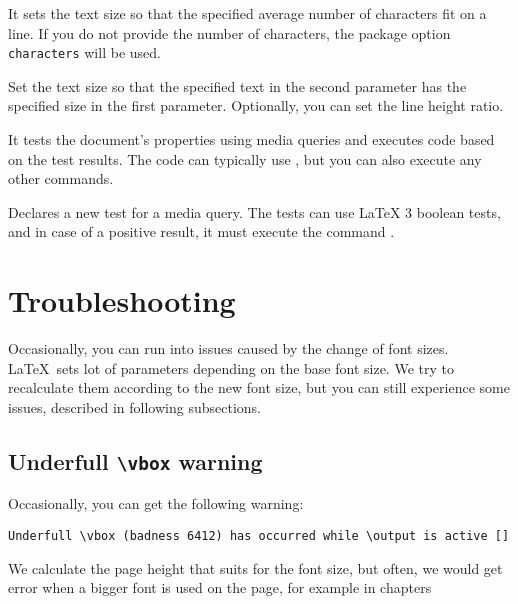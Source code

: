 \documentclass{ltxdoc}
\newcommand\StartDescribe[1]{%
  \par\medskip\noindent\DescribeMacro#1
}
\begin{document}
\noindent It sets the text size so that the specified average number of
characters fit on a line. If you do not provide the number of characters, the
package option \texttt{characters} will be used.


\StartDescribe\fonttobox
\cmd\fonttobox{}

\noindent Set the text size so that the specified text in the second parameter has
the specified size in the first parameter. Optionally, you can set the line
height ratio.

\StartDescribe\mediaquery
\cmd\mediaquery{}

\noindent
It tests the document's properties using media queries and executes code based on the test results.
The code can typically use \cmd\ResponsiveSetup, but you can also execute any other commands.

\StartDescribe\DeclareMediaQueryMatcher
\cmd\DeclareMediaQueryMatcher{}

\noindent Declares a new test for a media query. The tests can use LaTeX 3 boolean tests,
and in case of a positive result, it must execute the command 
\cmd\mediaquerytrue.


\section{Troubleshooting}

Occasionally, you can run into issues caused by the change of font sizes. \LaTeX\ sets lot of parameters 
depending on the base font size. We try to recalculate them according to the new font size, but you can still
experience some issues, described in following subsections.

\subsection{Underfull \texttt{\textbackslash vbox} warning}

Occasionally, you can get the following warning:

\begin{verbatim}
Underfull \vbox (badness 6412) has occurred while \output is active []
\end{verbatim}

We calculate the page height that suits  for the font size, but often,
we would get error when a bigger font is used on the page,
for example in chapters
\end{document}
